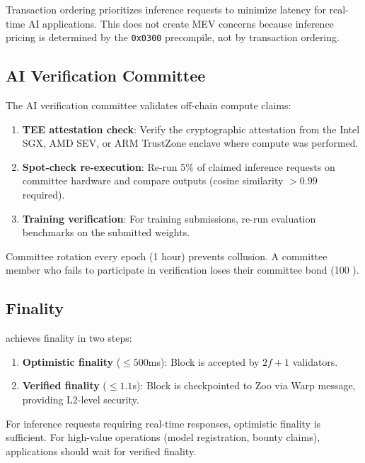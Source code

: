 Transaction ordering prioritizes inference requests to minimize latency for real-time AI applications. This does not create MEV concerns because inference pricing is determined by the \texttt{0x0300} precompile, not by transaction ordering.

\subsection{AI Verification Committee}

The AI verification committee validates off-chain compute claims:

\begin{enumerate}[nosep]
    \item \textbf{TEE attestation check}: Verify the cryptographic attestation from the Intel SGX, AMD SEV, or ARM TrustZone enclave where compute was performed.
    \item \textbf{Spot-check re-execution}: Re-run 5\% of claimed inference requests on committee hardware and compare outputs (cosine similarity $> 0.99$ required).
    \item \textbf{Training verification}: For training submissions, re-run evaluation benchmarks on the submitted weights.
\end{enumerate}

Committee rotation every epoch (1 hour) prevents collusion. A committee member who fails to participate in verification loses their committee bond (100 \BLG{}).

\subsection{Finality}

\Beluga{} achieves finality in two steps:

\begin{enumerate}[nosep]
    \item \textbf{Optimistic finality} ($\leq 500$ms): Block is accepted by $2f+1$ validators.
    \item \textbf{Verified finality} ($\leq 1.1$s): Block is checkpointed to Zoo via Warp message, providing L2-level security.
\end{enumerate}

For inference requests requiring real-time responses, optimistic finality is sufficient. For high-value operations (model registration, bounty claims), applications should wait for verified finality.

